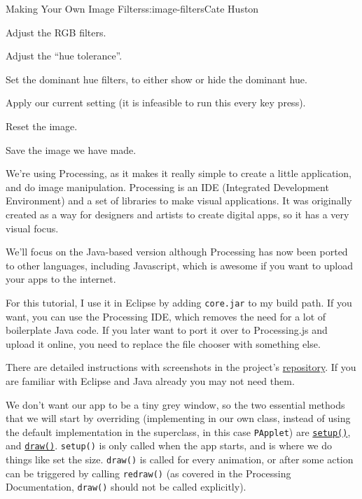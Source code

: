 \begin{aosachapter}{Making Your Own Image Filters}{s:image-filters}{Cate Huston}
\begin{aosaitemize}

\item
  Adjust the RGB filters.
\item
  Adjust the ``hue tolerance''.
\item
  Set the dominant hue filters, to either show or hide the dominant hue.
\item
  Apply our current setting (it is infeasible to run this every key
  press).
\item
  Reset the image.
\item
  Save the image we have made.
\end{aosaitemize}

We're using Processing, as it makes it really simple to create a little
application, and do image manipulation. Processing is an IDE (Integrated
Development Environment) and a set of libraries to make visual
applications. It was originally created as a way for designers and
artists to create digital apps, so it has a very visual focus.

We'll focus on the Java-based version although Processing has now been
ported to other languages, including Javascript, which is awesome if you
want to upload your apps to the internet.

For this tutorial, I use it in Eclipse by adding \texttt{core.jar} to my
build path. If you want, you can use the Processing IDE, which removes
the need for a lot of boilerplate Java code. If you later want to port
it over to Processing.js and upload it online, you need to replace the
file chooser with something else.

There are detailed instructions with screenshots in the project's
\href{https://github.com/aosabook/500lines/blob/master/image-filters/SETUP.MD}{repository}.
If you are familiar with Eclipse and Java already you may not need them.

\label{processing-basics}

\label{size-and-color}

We don't want our app to be a tiny grey window, so the two essential
methods that we will start by overriding (implementing in our own class,
instead of using the default implementation in the superclass, in this
case \texttt{PApplet}) are
\href{http://processing.org/reference/setup_.html}{\texttt{setup()}},
and \href{http://processing.org/reference/draw_.html}{\texttt{draw()}}.
\texttt{setup()} is only called when the app starts, and is where we do
things like set the size. \texttt{draw()} is called for every animation,
or after some action can be triggered by calling \texttt{redraw()} (as
covered in the Processing Documentation, \texttt{draw()} should not be
called explicitly).


\end{aosachapter}
